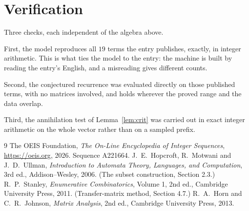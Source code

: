 \documentclass[11pt,a4paper]{article}
\theoremstyle{plain}
\theoremstyle{definition}
\begin{document}
\section{Verification}

Three checks, each independent of the algebra above.

First, the model reproduces all $19$ terms the entry publishes, exactly, in integer
arithmetic. This is what ties the model to the entry: the machine is built by reading the
entry's English, and a misreading gives different counts.

Second, the conjectured recurrence was evaluated directly on those published terms, with no
matrices involved, and holds wherever the proved range and the data overlap.

Third, the annihilation test of Lemma~\ref{lem:crit} was carried out in exact integer
arithmetic on the whole vector rather than on a sampled prefix.

\begin{thebibliography}{9}
 The OEIS Foundation, \emph{The On-Line Encyclopedia of Integer
Sequences}, \url{https://oeis.org}, 2026. Sequence A221664.
 J.~E.~Hopcroft, R.~Motwani and J.~D.~Ullman, \emph{Introduction to Automata
Theory, Languages, and Computation}, 3rd ed., Addison--Wesley, 2006. (The subset
construction, Section 2.3.)
 R.~P.~Stanley, \emph{Enumerative Combinatorics}, Volume 1, 2nd ed.,
Cambridge University Press, 2011. (Transfer-matrix method, Section 4.7.)
 R.~A.~Horn and C.~R.~Johnson, \emph{Matrix Analysis}, 2nd ed., Cambridge
University Press, 2013.
\end{thebibliography}
\end{document}
